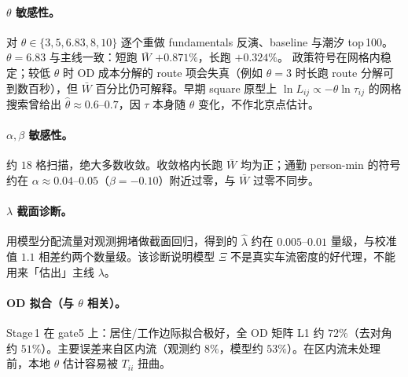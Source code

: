 \documentclass[11pt,a4paper]{article}
\begin{document}
\paragraph{$\theta$ 敏感性。}
对 $\theta\in\{3,5,6.83,8,10\}$ 逐个重做 fundamentals 反演、baseline 与潮汐 top\,100。
$\theta=6.83$ 与主线一致：短跑 $\bar W$ $+0.871\%$，长跑 $+0.324\%$。
政策符号在网格内稳定；较低 $\theta$ 时 OD 成本分解的 route 项会失真（例如 $\theta=3$ 时长跑 route 分解可到数百秒），但 $\bar W$ 百分比仍可解释。早期 square 原型上 $\ln L_{ij}\propto -\theta\ln\tau_{ij}$ 的网格搜索曾给出 $\hat\theta\approx 0.6$--$0.7$，因 $\tau$ 本身随 $\theta$ 变化，不作北京点估计。

\paragraph{$\alpha,\beta$ 敏感性。}
约 $18$ 格扫描，绝大多数收敛。收敛格内长跑 $\bar W$ 均为正；通勤 person-min 的符号约在 $\alpha\approx 0.04$--$0.05$（$\beta=-0.10$）附近过零，与 $\bar W$ 过零不同步。

\paragraph{$\lambda$ 截面诊断。}
用模型分配流量对观测拥堵做截面回归，得到的 $\hat\lambda$ 约在 $0.005$--$0.01$ 量级，与校准值 $1.1$ 相差约两个数量级。该诊断说明模型 $\Xi$ 不是真实车流密度的好代理，不能用来「估出」主线 $\lambda$。

\paragraph{OD 拟合（与 $\theta$ 相关）。}
Stage\,1 在 gate5 上：居住/工作边际拟合极好，全 OD 矩阵 L1 约 $72\%$（去对角约 $51\%$）。主要误差来自区内流（观测约 $8\%$，模型约 $53\%$）。在区内流未处理前，本地 $\theta$ 估计容易被 $T_{ii}$ 扭曲。
\end{document}
